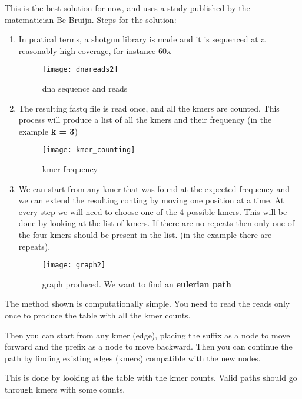 This is the best solution for now, and uses a study published by the
matematician Be Bruijn.
Steps for the solution:
\begin{enumerate}
  \item In pratical terms, a shotgun library is made and it is sequenced at a
reasonably high coverage, for instance 60x

\begin{figure}[H]
  \centering
  \texttt{[image: dnareads2]}
  \caption{dna sequence and reads}
  \label{fig:dnareads}
\end{figure}

  \item The resulting fastq file is read once, and all the kmers are counted.
This process will produce a list of all the kmers and their frequency
(in the example \textbf{k = 3})

\begin{figure}[H]
  \centering
  \texttt{[image: kmer\_counting]}
  \caption{kmer frequency}
  \label{fig:kmer_counting}
\end{figure}

  \item We can start from any kmer that was found at the expected frequency and
we can extend the resulting conting by moving one position at a time. At every
step we will need to choose one of the 4 possible kmers. This will be done by
looking at the list of kmers. If there are no repeats then only one of the four
kmers should be present in the list.
(in the example there are repeats).

\begin{figure}[H]
  \centering
  \texttt{[image: graph2]}
  \caption{graph produced. We want to find an \textbf{eulerian path}}
  \label{fig:graph2}
\end{figure}

\end{enumerate}

The method shown is computationally simple.
You need to read the reads only once to produce the table with all the kmer
counts.

Then you can start from any kmer (edge), placing the suffix as a node to
move forward and the prefix as a node to move backward.
Then you can continue the path by finding existing  edges (kmers)
compatible with the new nodes.

This is done by looking at the table with the kmer counts.
Valid paths should go through kmers with some counts.

